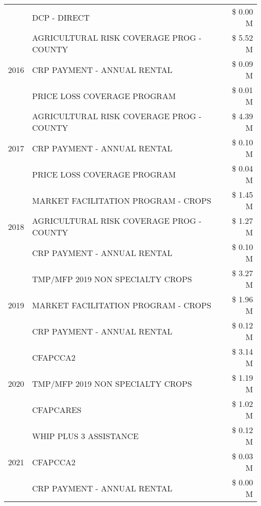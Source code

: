 \begin{tabular}{llr}
 & DCP - DIRECT & \$ 0.00 M \\
\cline{1-3}
\multirow[t]{3}{*}{2016} & AGRICULTURAL RISK COVERAGE PROG - COUNTY      & \$ 5.52 M \\
 & CRP PAYMENT - ANNUAL RENTAL                   & \$ 0.09 M \\
 & PRICE LOSS COVERAGE PROGRAM                   & \$ 0.01 M \\
\cline{1-3}
\multirow[t]{3}{*}{2017} & AGRICULTURAL RISK COVERAGE PROG - COUNTY & \$ 4.39 M \\
 & CRP PAYMENT - ANNUAL RENTAL & \$ 0.10 M \\
 & PRICE LOSS COVERAGE PROGRAM & \$ 0.04 M \\
\cline{1-3}
\multirow[t]{3}{*}{2018} & MARKET FACILITATION PROGRAM - CROPS & \$ 1.45 M \\
 & AGRICULTURAL RISK COVERAGE PROG - COUNTY & \$ 1.27 M \\
 & CRP PAYMENT - ANNUAL RENTAL & \$ 0.10 M \\
\cline{1-3}
\multirow[t]{3}{*}{2019} & TMP/MFP 2019 NON SPECIALTY CROPS & \$ 3.27 M \\
 & MARKET FACILITATION PROGRAM - CROPS & \$ 1.96 M \\
 & CRP PAYMENT - ANNUAL RENTAL & \$ 0.12 M \\
\cline{1-3}
\multirow[t]{3}{*}{2020} & CFAPCCA2 & \$ 3.14 M \\
 & TMP/MFP 2019 NON SPECIALTY CROPS & \$ 1.19 M \\
 & CFAPCARES & \$ 1.02 M \\
\cline{1-3}
\multirow[t]{3}{*}{2021} & WHIP PLUS 3 ASSISTANCE & \$ 0.12 M \\
 & CFAPCCA2 & \$ 0.03 M \\
 & CRP PAYMENT - ANNUAL RENTAL & \$ 0.00 M \\
\cline{1-3}
\bottomrule
\end{tabular}
